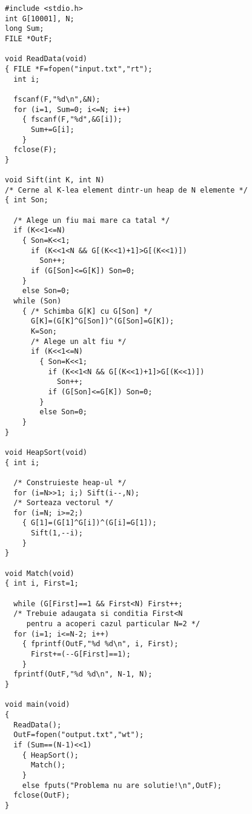 \begin{verbatim}
#include <stdio.h>
int G[10001], N;
long Sum;
FILE *OutF;

void ReadData(void)
{ FILE *F=fopen("input.txt","rt");
  int i;

  fscanf(F,"%d\n",&N);
  for (i=1, Sum=0; i<=N; i++)
    { fscanf(F,"%d",&G[i]);
      Sum+=G[i];
    }
  fclose(F);
}

void Sift(int K, int N)
/* Cerne al K-lea element dintr-un heap de N elemente */
{ int Son;

  /* Alege un fiu mai mare ca tatal */
  if (K<<1<=N)
    { Son=K<<1;
      if (K<<1<N && G[(K<<1)+1]>G[(K<<1)])
        Son++;
      if (G[Son]<=G[K]) Son=0;
    }
    else Son=0;
  while (Son)
    { /* Schimba G[K] cu G[Son] */
      G[K]=(G[K]^G[Son])^(G[Son]=G[K]);
      K=Son;
      /* Alege un alt fiu */
      if (K<<1<=N)
        { Son=K<<1;
          if (K<<1<N && G[(K<<1)+1]>G[(K<<1)])
            Son++;
          if (G[Son]<=G[K]) Son=0;
        }
        else Son=0;
    }
}

void HeapSort(void)
{ int i;

  /* Construieste heap-ul */
  for (i=N>>1; i;) Sift(i--,N);
  /* Sorteaza vectorul */
  for (i=N; i>=2;)
    { G[1]=(G[1]^G[i])^(G[i]=G[1]);
      Sift(1,--i);
    }
}

void Match(void)
{ int i, First=1;

  while (G[First]==1 && First<N) First++;
  /* Trebuie adaugata si conditia First<N
     pentru a acoperi cazul particular N=2 */
  for (i=1; i<=N-2; i++)
    { fprintf(OutF,"%d %d\n", i, First);
      First+=(--G[First]==1);
    }
  fprintf(OutF,"%d %d\n", N-1, N);
}

void main(void)
{
  ReadData();
  OutF=fopen("output.txt","wt");
  if (Sum==(N-1)<<1)
    { HeapSort();
      Match();
    }
    else fputs("Problema nu are solutie!\n",OutF);
  fclose(OutF);
}
\end{verbatim}
